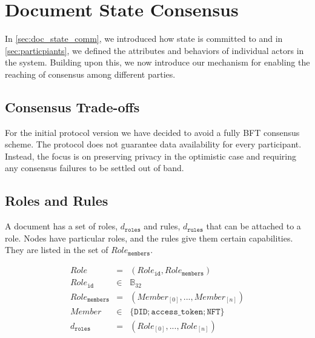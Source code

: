 \section{Document State Consensus}
\label{sec:consensus}
In \ref{sec:doc_state_comm}, we introduced how state is committed to and in \ref{sec:particpiants}, we defined the attributes and behaviors of individual actors in the system. Building upon this, we now introduce our mechanism for enabling the reaching of consensus among different parties.
\subsection{Consensus Trade-offs}
For the initial protocol version we have decided to avoid a fully BFT consensus scheme. The protocol does not guarantee data availability for every participant. Instead, the focus is on preserving privacy in the optimistic case and requiring any consensus failures to be settled out of band. 

\subsection{Roles and Rules}\label{sec:roles_rules}
A document has a set of roles, $d_{\mathtt{roles}}$ and rules, $d_{\mathtt{rules}}$ that can be attached to a role. Nodes have particular roles, and the rules give them certain capabilities. They are listed in the set of $Role_{\mathtt{members}}$.

\begin{eqnarray}
Role &= &(Role_\mathtt{id},Role_{\mathtt{members}}) \\
Role_{\mathtt{id}} &\in & \mathbb{B}_{32}\\
Role_{\mathtt{members}}  &=& (Member_{[0]},...,Member_{[n]}) \\
Member &\in & \{\mathtt{DID};\mathtt{access\_token};\mathtt{NFT}\} \\
d_{\mathtt{roles}} & = & (Role_{[0]}, ..., Role_{[n]})
\end{eqnarray}


